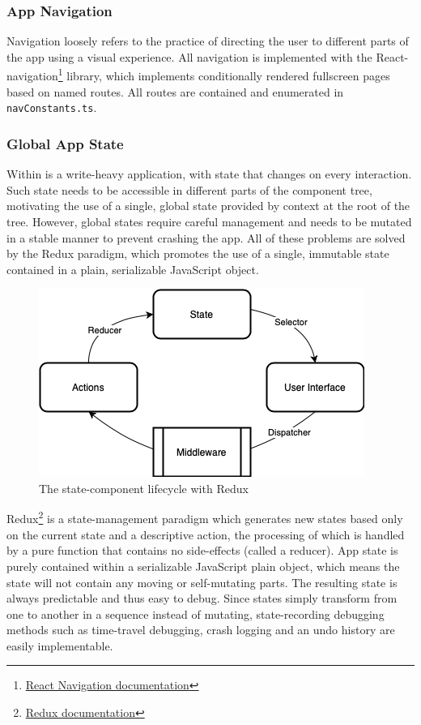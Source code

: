 \subsubsection{App Navigation}
Navigation loosely refers to the practice of directing the user to different parts of the app using a visual experience. All navigation is implemented with the React-navigation\footnote{\href{https://reactnavigation.org}{React Navigation documentation}} library, which implements conditionally rendered fullscreen pages based on named routes. All routes are contained and enumerated in \texttt{navConstants.ts}.

\subsubsection{Global App State}
Within is a write-heavy application, with state that changes on every interaction. Such state needs to be accessible in different parts of the component tree, motivating the use of a single, global state provided by context at the root of the tree. However, global states require careful management and needs to be mutated in a stable manner to prevent crashing the app. All of these problems are solved by the Redux paradigm, which promotes the use of a single, immutable state contained in a plain, serializable JavaScript object.

\begin{figure}[h]
    \begin{center}
        \includegraphics[scale=0.55]{images/redux_state.png}
    \end{center}
    \caption{The state-component lifecycle with Redux}
    \label{fig:redux_state}
\end{figure}

Redux\footnote{\href{https://redux.js.org/usage/usage-with-typescript}{Redux documentation}} is a state-management paradigm which generates new states based only on the current state and a descriptive action, the processing of which is handled by a pure function that contains no side-effects (called a reducer). App state is purely contained within a serializable JavaScript plain object, which means the state will not contain any moving or self-mutating parts. The resulting state is always predictable and thus easy to debug. Since states simply transform from one to another in a sequence instead of mutating, state-recording debugging methods such as time-travel debugging, crash logging and an undo history are easily implementable.


